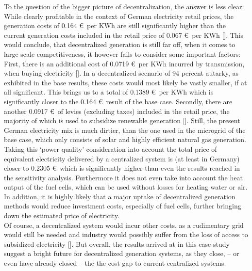 \documentclass[
	11pt,								%
	DIV10,								%
	a4paper,         					%
	oneside,							%
	headheight=20pt,					%
	footheight=20pt,					%
    parskip=full,						%
    listof=totoc,						%
	bibliography=totoc,					%
	index=totoc,						%
]{scrartcl}
\begin{document}
To the question of the bigger picture of decentralization, the answer is less clear: While clearly profitable in the context of German electricity retail prices, the generation costs of 0.164 \euro\ per KWh are still significantly higher than the current generation costs included in the retail price of 0.067 \euro\ per KWh [\cite{Monitoringbericht20182018}]. This would conclude, that decentralized generation is still far off, when it comes to large scale competitiveness, it however fails to consider some important factors: First, there is an additional cost of 0.0719 \euro\ per KWh incurred by transmission, when buying electricity [\cite{Monitoringbericht20182018}]. 
In a decentralized scenario of 94 percent autarky, as exhibited in the base results, these costs would most likely be vastly smaller, if at all significant. This brings us to a total of 0.1389 \euro\ per KWh which is significantly closer to the 0.164 \euro\ result of the base case. Secondly, there are another 0.0917 \euro\ of levies (excluding taxes) included in the retail price, the majority of which is used to subsidize renewable generation [\cite{Monitoringbericht20182018}]. Still, the present German electricity mix is much dirtier, than the one used in the microgrid of the base case, which only consists of solar and highly efficient natural gas generation. 
Taking this `power quality' consideration into account the total price of equivalent electricity delivered by a centralized system is (at least in Germany) closer to 0.2305 \euro\, which is significantly higher than even the results reached in the sensitivity analysis. Furthermore it does not even take into account the heat output of the fuel cells, which can be used without losses for heating water or air.\\
	In addition, it is highly likely that a major uptake of decentralized generation methods would reduce investment costs, especially of fuel cells, further bringing down the estimated price of electricity. \\
	Of course, a decentralized system would incur other costs, as a rudimentary grid would still be needed and industry would possibly suffer from the loss of access to subsidized electricity [\cite{kuechlerIndustriestrompreiseDeutschlandUnd2014}].
	But overall, the results arrived at in this case study suggest a bright future for decentralized generation systems, as they close, – or even have already closed – the the cost gap to current centralized systems.

\newpage
{}	
\end{document}
